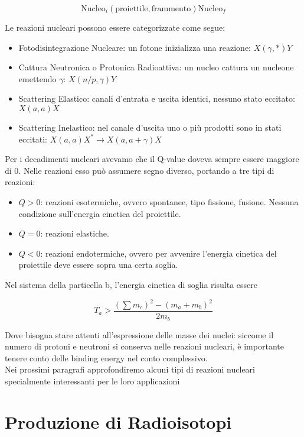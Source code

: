 \documentclass [a4paper, twoside] {book}
\begin{document}
\begin{equation}
\text{Nucleo}_i(\text{proiettile},\text{frammento})\text{Nucleo}_f
\end{equation}

Le reazioni nucleari possono essere categorizzate come segue:

\begin{itemize}
\item Fotodisintegrazione Nucleare: un fotone inizializza una reazione: $X(\gamma,*)Y$
\item Cattura Neutronica o Protonica Radioattiva: un nucleo cattura un nucleone emettendo $\gamma$: $X(n/p,\gamma)Y$
\item Scattering Elastico: canali d'entrata e uscita identici, nessuno stato eccitato: $X(a,a)X$
\item Scattering Inelastico: nel canale d'uscita uno o più prodotti sono in stati eccitati: $X(a,a)X^* \rightarrow X(a,a+\gamma)X$
\end{itemize}

Per i decadimenti nucleari avevamo che il Q-value doveva sempre essere maggiore di 0. Nelle reazioni esso può assumere segno diverso, portando a tre tipi di reazioni:

\begin{itemize}
\item $Q>0$: reazioni esotermiche, ovvero spontanee, tipo fissione, fusione. Nessuna condizione sull'energia cinetica del proiettile.
\item $Q=0$: reazioni elastiche.
\item $Q<0$: reazioni endotermiche, ovvero per avvenire l'energia cinetica del proiettile deve essere sopra una certa soglia.
\end{itemize}

Nel sistema della particella b, l'energia cinetica di soglia risulta essere

\begin{equation}
T_a>\frac{(\sum m_c)^2-(m_a+m_b)^2}{2m_b}
\end{equation}

Dove bisogna stare attenti all'espressione delle masse dei nuclei: siccome il numero di protoni e neutroni si conserva nelle reazioni nucleari, è importante tenere conto delle binding energy nel conto complessivo. \\
Nei prossimi paragrafi approfondiremo alcuni tipi di reazioni nucleari specialmente interessanti per le loro applicazioni 

\section{Produzione di Radioisotopi}
\end{document}
